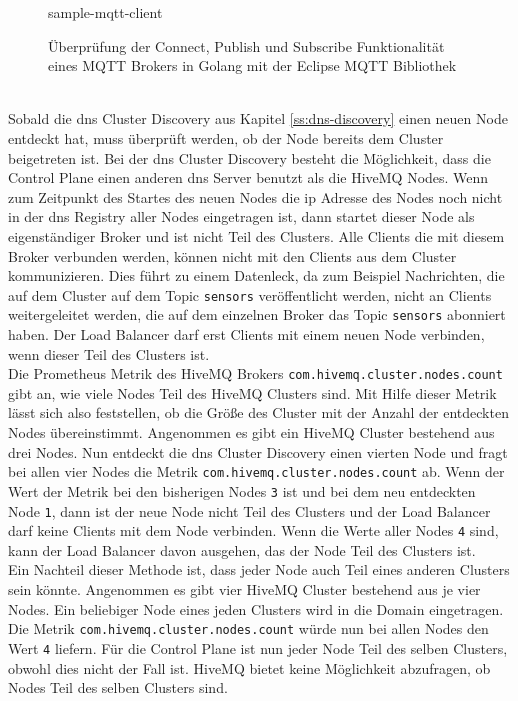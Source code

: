 \begin{figure}
    {sample-mqtt-client}
    \caption{Überprüfung der Connect, Publish und Subscribe Funktionalität eines MQTT Brokers in Golang mit der Eclipse MQTT Bibliothek}
    \label{code:sample-mqtt-client}
\end{figure}
\\
Sobald die \ac{dns} Cluster Discovery aus Kapitel \ref{ss:dns-discovery} einen neuen Node entdeckt hat, muss überprüft werden, ob der Node bereits dem Cluster beigetreten ist. Bei der \ac{dns} Cluster Discovery besteht die Möglichkeit, dass die Control Plane einen anderen \ac{dns} Server benutzt als die HiveMQ Nodes. Wenn zum Zeitpunkt des Startes des neuen Nodes die \ac{ip} Adresse des Nodes noch nicht in der \ac{dns} Registry aller Nodes eingetragen ist, dann startet dieser Node als eigenständiger Broker und ist nicht Teil des Clusters.
Alle Clients die mit diesem Broker verbunden werden, können nicht mit den Clients aus dem Cluster kommunizieren. Dies führt zu einem Datenleck, da zum Beispiel Nachrichten, die auf dem Cluster auf dem Topic \verb|sensors| veröffentlicht werden, nicht an Clients weitergeleitet werden, die auf dem einzelnen Broker das Topic \verb|sensors| abonniert haben.
Der Load Balancer darf erst Clients mit einem neuen Node verbinden, wenn dieser Teil des Clusters ist.
\\
Die Prometheus Metrik des HiveMQ Brokers \verb|com.hivemq.cluster.nodes.count| gibt an, wie viele Nodes Teil des HiveMQ Clusters sind. Mit Hilfe dieser Metrik lässt sich also feststellen, ob die Grö{\ss}e des Cluster mit der Anzahl der entdeckten Nodes übereinstimmt. Angenommen es gibt ein HiveMQ Cluster bestehend aus drei Nodes. Nun entdeckt die \ac{dns} Cluster Discovery einen vierten Node und fragt bei allen vier Nodes die Metrik \verb|com.hivemq.cluster.nodes.count| ab. Wenn der Wert der Metrik bei den bisherigen Nodes \verb|3| ist und bei dem neu entdeckten Node \verb|1|, dann ist der neue Node nicht Teil des Clusters und der Load Balancer darf keine Clients mit dem Node verbinden. Wenn die Werte aller Nodes \verb|4| sind, kann der Load Balancer davon ausgehen, das der Node Teil des Clusters ist.
\\
Ein Nachteil dieser Methode ist, dass jeder Node auch Teil eines anderen Clusters sein könnte. Angenommen es gibt vier HiveMQ Cluster bestehend aus je vier Nodes. Ein beliebiger Node eines jeden Clusters wird in die Domain eingetragen. Die Metrik \verb|com.hivemq.cluster.nodes.count| würde nun bei allen Nodes den Wert \verb|4| liefern. Für die Control Plane ist nun jeder Node Teil des selben Clusters, obwohl dies nicht der Fall ist. HiveMQ bietet keine Möglichkeit abzufragen, ob Nodes Teil des selben Clusters sind.
